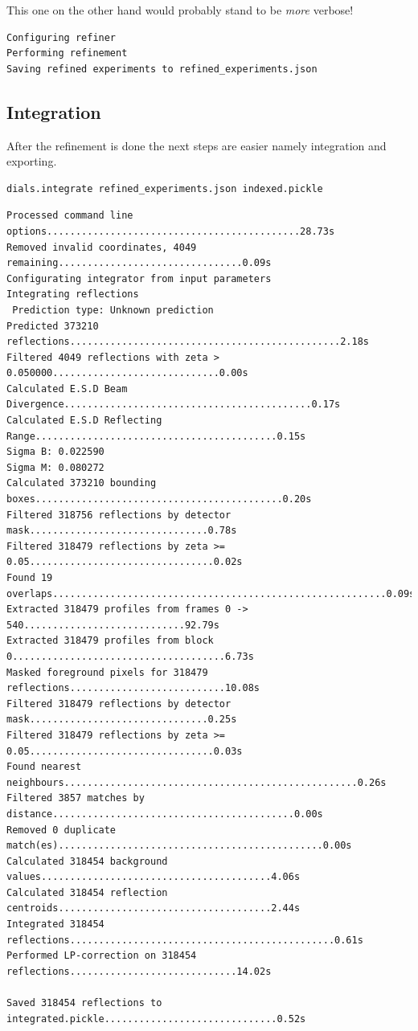 \documentclass[a4paper, 11pt]{article}
\begin{document}
\noindent
This one on the other hand would probably stand to be \emph{more} verbose!

{\small
\begin{verbatim}
Configuring refiner
Performing refinement
Saving refined experiments to refined_experiments.json
\end{verbatim}
}

\subsection{Integration}

After the refinement is done the next steps are easier namely
integration and exporting.


{\small
\begin{verbatim}
dials.integrate refined_experiments.json indexed.pickle 
\end{verbatim}
}

{\small
\begin{verbatim}
Processed command line options............................................28.73s
Removed invalid coordinates, 4049 remaining................................0.09s
Configurating integrator from input parameters
Integrating reflections
 Prediction type: Unknown prediction
Predicted 373210 reflections...............................................2.18s
Filtered 4049 reflections with zeta > 0.050000.............................0.00s
Calculated E.S.D Beam Divergence...........................................0.17s
Calculated E.S.D Reflecting Range..........................................0.15s
Sigma B: 0.022590
Sigma M: 0.080272
Calculated 373210 bounding boxes...........................................0.20s
Filtered 318756 reflections by detector mask...............................0.78s
Filtered 318479 reflections by zeta >= 0.05................................0.02s
Found 19 overlaps..........................................................0.09s
Extracted 318479 profiles from frames 0 -> 540............................92.79s
Extracted 318479 profiles from block 0.....................................6.73s
Masked foreground pixels for 318479 reflections...........................10.08s
Filtered 318479 reflections by detector mask...............................0.25s
Filtered 318479 reflections by zeta >= 0.05................................0.03s
Found nearest neighbours...................................................0.26s
Filtered 3857 matches by distance..........................................0.00s
Removed 0 duplicate match(es)..............................................0.00s
Calculated 318454 background values........................................4.06s
Calculated 318454 reflection centroids.....................................2.44s
Integrated 318454 reflections..............................................0.61s
Performed LP-correction on 318454 reflections.............................14.02s

Saved 318454 reflections to integrated.pickle..............................0.52s
\end{verbatim}
}
\end{document}

